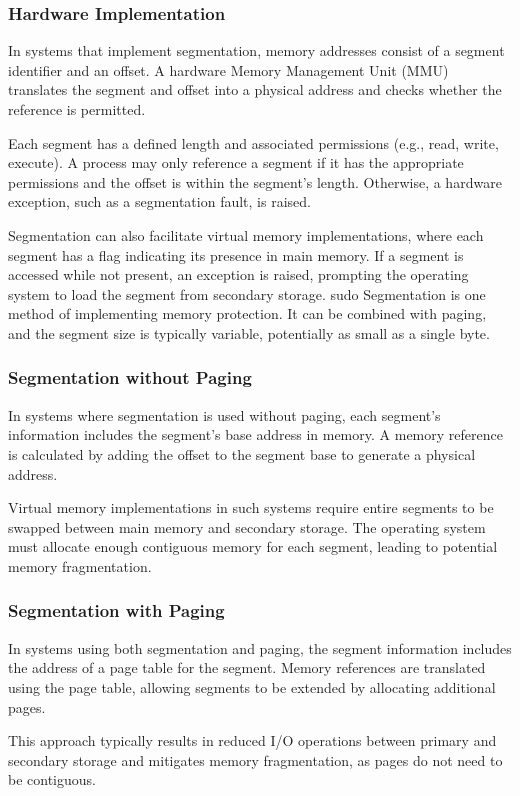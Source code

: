 \documentclass[12pt, oneside]{book}
\begin{document}
\subsubsection{Hardware Implementation}
In systems that implement segmentation, memory addresses consist of a segment identifier and an offset. A hardware Memory Management Unit (MMU) translates the segment and offset into a physical address and checks whether the reference is permitted.

Each segment has a defined length and associated permissions (e.g., read, write, execute). A process may only reference a segment if it has the appropriate permissions and the offset is within the segment's length. Otherwise, a hardware exception, such as a segmentation fault, is raised.

Segmentation can also facilitate virtual memory implementations, where each segment has a flag indicating its presence in main memory. If a segment is accessed while not present, an exception is raised, prompting the operating system to load the segment from secondary storage.
sudo
Segmentation is one method of implementing memory protection. It can be combined with paging, and the segment size is typically variable, potentially as small as a single byte.

\subsubsection{Segmentation without Paging}
In systems where segmentation is used without paging, each segment's information includes the segment's base address in memory. A memory reference is calculated by adding the offset to the segment base to generate a physical address.

Virtual memory implementations in such systems require entire segments to be swapped between main memory and secondary storage. The operating system must allocate enough contiguous memory for each segment, leading to potential memory fragmentation.

\subsubsection{Segmentation with Paging}
In systems using both segmentation and paging, the segment information includes the address of a page table for the segment. Memory references are translated using the page table, allowing segments to be extended by allocating additional pages.

This approach typically results in reduced I/O operations between primary and secondary storage and mitigates memory fragmentation, as pages do not need to be contiguous.
\end{document}
